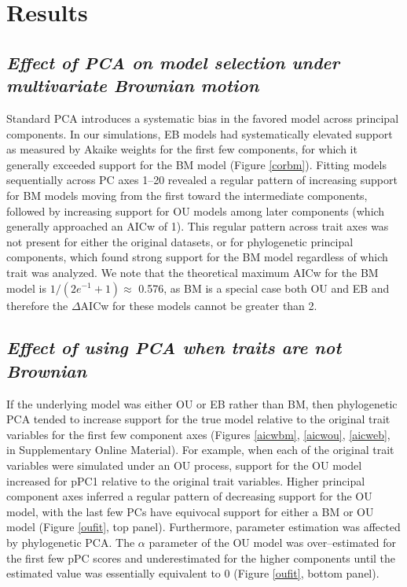 \documentclass[a4paper,12pt]{article}
\begin{document}
\section{Results}
\subsection{\emph{Effect of PCA on model selection under multivariate Brownian motion}}
Standard PCA introduces a systematic bias in the favored model across principal components. In our simulations, EB models had systematically elevated support as measured by Akaike weights for the first few components, for which it generally exceeded support for the BM model (Figure \ref{corbm}). Fitting models sequentially across PC axes 1--20 revealed a regular pattern of increasing support for BM models moving from the first toward the intermediate components, followed by increasing support for OU models among later components (which generally approached an AICw of 1). This regular pattern across trait axes was not present for either the original datasets, or for phylogenetic principal components, which found strong support for the BM model regardless of which trait was analyzed. We note that the theoretical maximum AICw for the BM model is $1/(2e^{-1} + 1) \approx$ 0.576, as BM is a special case both OU and EB and therefore the $\Delta$AICw for these models cannot be greater than 2.   

\subsection{\emph{Effect of using PCA when traits are not Brownian}}
If the underlying model was either OU or EB rather than BM, then phylogenetic PCA tended to increase support for the true model relative to the original trait variables for the first few component axes (Figures \ref{aicwbm}, \ref{aicwou}, \ref{aicweb}, in Supplementary Online Material). For example, when each of the original trait variables were simulated under an OU process, support for the OU model increased for pPC1 relative to the original trait variables. Higher principal component axes inferred a regular pattern of decreasing support for the OU model, with the last few PCs have equivocal support for either a BM or OU model (Figure \ref{oufit}, top panel). Furthermore, parameter estimation was affected by phylogenetic PCA. The $\alpha$ parameter of the OU model was over--estimated for the first few pPC scores and underestimated for the higher components until the estimated value was essentially equivalent to 0 (Figure \ref{oufit}, bottom panel). 
\end{document}
